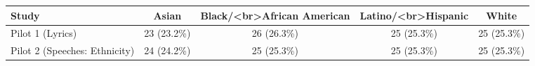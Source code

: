\begin{table}[t]
\fontsize{12.0pt}{14.4pt}\selectfont
\begin{tabular*}{\linewidth}{@{\extracolsep{\fill}}lcccc}
\toprule
Study & Asian & Black/<br>African American & Latino/<br>Hispanic & White \\ 
\midrule\addlinespace[2.5pt]
Pilot 1 (Lyrics) & 23 (23.2\%) & 26 (26.3\%) & 25 (25.3\%) & 25 (25.3\%) \\ 
Pilot 2 (Speeches: Ethnicity) & 24 (24.2\%) & 25 (25.3\%) & 25 (25.3\%) & 25 (25.3\%) \\ 
\bottomrule
\end{tabular*}
\end{table}

